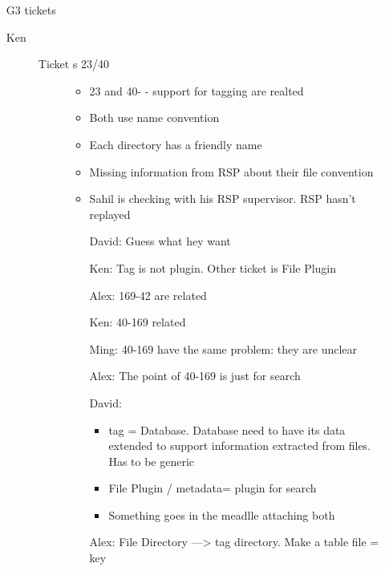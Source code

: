 \documentclass[a4paper,10pt]{article}
\begin{document}
\begin{enumerate}
\item[G3 tickets]\begin{description}
              \item[Ken]\begin{description}
                         \item[Ticket s 23/40]\begin{itemize}
                                   \item 23 and 40- - support for tagging are realted
                                   \item Both use name convention
                                   \item Each directory has a friendly name
                                   \item Missing information from RSP about their file convention
                                   \item Sahil is checking with his RSP supervisor. RSP hasn't replayed
                                   \item[David:] Guess what hey want
                                   \item[Ken:] Tag is not plugin.  Other ticket is File Plugin
                                   \item[Alex:] 169-42 are related
                                   \item[Ken:] 40-169 related
                                   \item[Ming:] 40-169 have the same problem: they are unclear
                                   \item[Alex:] The point of 40-169 is just for search
                                   \item[David:] \begin{itemize}
                                                  \item tag = Database.  Database need to have its data extended to support information extracted from files.  Has to be generic
                                                  \item File Plugin  / metadata= plugin for search
                                                  \item Something goes in the meadlle attaching both
                                                 \end{itemize}
                                  \item[Alex:] File Directory ---> tag directory.  Make a table file = key

\end{itemize}
\end{description}
\end{description}
\end{enumerate}
\end{document}
